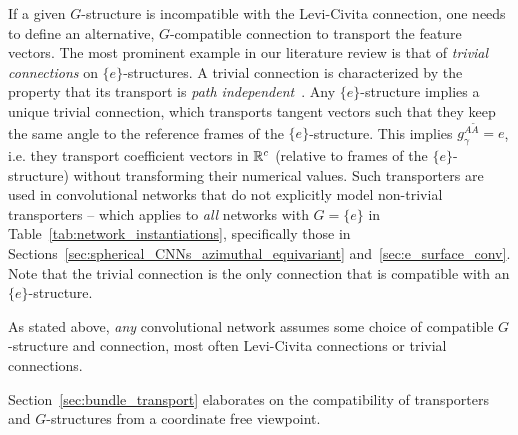 If a given $G$-structure is incompatible with the Levi-Civita connection, one needs to define an alternative, $G$-compatible connection to transport the feature vectors.
The most prominent example in our literature review is that of \emph{trivial connections} on $\{e\}$-structures.
A trivial connection is characterized by the property that its transport is \emph{path independent}~\cite{craneTrivialConnectionsDiscrete2010}.
Any $\{e\}$-structure implies a unique trivial connection, which transports tangent vectors such that they keep the same angle to the reference frames of the $\{e\}$-structure.
This implies $g_\gamma^{A\widetilde{A}} = e$, i.e. they transport coefficient vectors in $\mathbb{R}^c$ (relative to frames of the $\{e\}$-structure) without transforming their numerical values.
Such transporters are used in convolutional networks that do not explicitly model non-trivial transporters -- which applies to \emph{all} networks with $G=\{e\}$ in Table~\ref{tab:network_instantiations}, specifically those in Sections~\ref{sec:spherical_CNNs_azimuthal_equivariant} and~\ref{sec:e_surface_conv}.
Note that the trivial connection is the only connection that is compatible with an $\{e\}$-structure.

As stated above, \emph{any} convolutional network assumes some choice of compatible $G$-structure and connection,
most often Levi-Civita connections or trivial connections.

Section~\ref{sec:bundle_transport} elaborates on the compatibility of transporters and $G$-structures from a coordinate free viewpoint.
